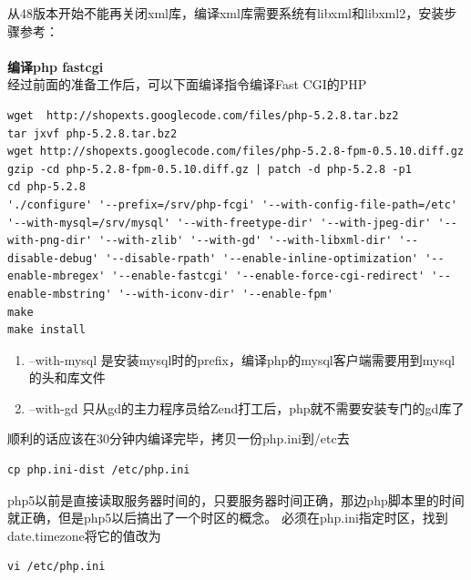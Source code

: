 \documentclass{article}
\begin{document}
从48版本开始不能再关闭xml库，编译xml库需要系统有libxml和libxml2，安装步骤参考：



\paragraph{}\textbf{编译php fastcgi}\\

经过前面的准备工作后，可以下面编译指令编译Fast CGI的PHP

\begin{verbatim}
wget  http://shopexts.googlecode.com/files/php-5.2.8.tar.bz2
tar jxvf php-5.2.8.tar.bz2
wget http://shopexts.googlecode.com/files/php-5.2.8-fpm-0.5.10.diff.gz
gzip -cd php-5.2.8-fpm-0.5.10.diff.gz | patch -d php-5.2.8 -p1
cd php-5.2.8
'./configure' '--prefix=/srv/php-fcgi' '--with-config-file-path=/etc' '--with-mysql=/srv/mysql' '--with-freetype-dir' '--with-jpeg-dir' '--with-png-dir' '--with-zlib' '--with-gd' '--with-libxml-dir' '--disable-debug' '--disable-rpath' '--enable-inline-optimization' '--enable-mbregex' '--enable-fastcgi' '--enable-force-cgi-redirect' '--enable-mbstring' '--with-iconv-dir' '--enable-fpm' 
make 
make install
\end{verbatim}
\begin{enumerate}
\item --with-mysql                是安装mysql时的prefix，编译php的mysql客户端需要用到mysql的头和库文件
\item --with-gd                        只从gd的主力程序员给Zend打工后，php就不需要安装专门的gd库了
\end{enumerate}

顺利的话应该在30分钟内编译完毕，拷贝一份php.ini到/etc去

\begin{verbatim}
cp php.ini-dist /etc/php.ini
\end{verbatim}

php5以前是直接读取服务器时间的，只要服务器时间正确，那边php脚本里的时间就正确，但是php5以后搞出了一个时区的概念。   必须在php.ini指定时区，找到date.timezone将它的值改为 

\begin{verbatim}
vi /etc/php.ini
\end{verbatim}
\end{document}
